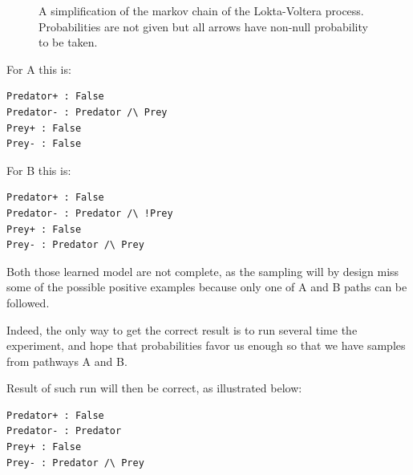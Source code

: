 \documentclass{llncs}
\begin{document}
\begin{figure}[htpb]
	\centering
	\caption{A simplification of the markov chain of the Lokta-Voltera process. Probabilities are not given but all arrows have non-null probability to be taken.\label{fig:mc-lv}}
\end{figure}

For A this is:
\begin{verbatim}
Predator+ : False
Predator- : Predator /\ Prey
Prey+ : False
Prey- : False
\end{verbatim}

For B this is:
\begin{verbatim}
Predator+ : False
Predator- : Predator /\ !Prey
Prey+ : False
Prey- : Predator /\ Prey
\end{verbatim}

Both those learned model are not complete, as the sampling will by design miss some of the possible positive examples because only one of A and B paths can be followed.

Indeed, the only way to get the correct result is to run several time the experiment, and hope that probabilities favor us enough so that we have samples from pathways A and B.

Result of such run will then be correct, as illustrated below:
\begin{verbatim}
Predator+ : False
Predator- : Predator
Prey+ : False
Prey- : Predator /\ Prey
\end{verbatim}
\end{document}

